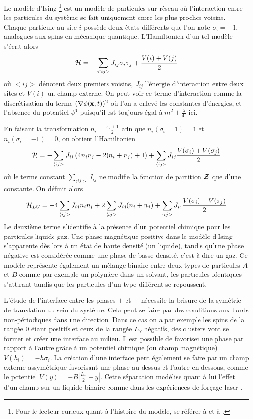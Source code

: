   	Le modèle d'Ising \footnote{Pour le lecteur curieux quant à l'histoire du modèle, se référer à \cite{niss_history_2005} et à \cite{niss_history_2009}.} est un modèle de particules sur réseau où l'interaction entre les particules du système se fait uniquement entre les plus proches voisins. Chaque particule au site $i$ possède deux états différents que l'on note $\sigma_i = \pm 1$, analogues aux spins en mécanique quantique. L'Hamiltonien d'un tel modèle s'écrit alors
\begin{equation}
	\mathcal{H} =  - \sum_{<i j >} J_{ij} \sigma_i \sigma_j + \frac{V(i)+V(j)}{2}
\end{equation}
où $< ij >$ dénotent deux premiers voisins, $J_{ij}$ l'énergie d'interaction entre deux sites et $V(i)$ un champ externe. On peut voir ce terme d'interaction comme la discrétisation du terme $(\nabla \phi({\bf x},t))^2$ où l'on a enlevé les constantes d'énergies, et l'absence du potentiel $\phi^4$ puisqu'il est toujours égal à $m^2+\frac{\lambda}{4!}$ ici. 

En faisant la transformation\cite{goldenfeld_lectures_2018} $n_i =  \frac{\sigma_i +1}{2}$ afin que $n_i(\sigma_i = 1) = 1$ et $n_i(\sigma_i = -1) = 0$, on obtient l'Hamiltonien
\begin{equation}
	\mathcal{H} =  - \sum_{\langle i j >}  J_{ij} \left( 4 n_i n_j -2 ( n_i+n_j) + 1 \right)+ \sum_{\langle i j >}  J_{ij} \frac{V(\sigma_i)+V(\sigma_j)}{2}  
\end{equation}
où le terme constant $\sum_{\langle i j >}  J_{ij}$ ne modifie la fonction de partition $\mathcal{Z}$ que d'une constante. On définit alors 
\begin{equation}
	\mathcal{H}_{LG} =  - 4 \sum_{\langle i j >}  J_{ij}  n_i n_j  + 2 \sum_{\langle i j >}  J_{ij}  (n_i+n_j) + \sum_{\langle i j >}  J_{ij} \frac{V(\sigma_i)+V(\sigma_j)}{2}  
\end{equation}
Le deuxième terme s'identifie à la présence d'un potentiel chimique pour les particules liquide-gaz. Une phase magnétique positive dans le modèle d'Ising s'apparente dès lors à un état de haute densité (un liquide), tandis qu'une phase négative est considérée comme une phase de basse densité, c'est-à-dire un gaz.
Ce modèle représente également un mélange binaire entre deux types de particules $A$ et $B$ comme par exemple un polymère dans un solvant, les particules identiques s'attirant tandis que les particules d'un type différent se repoussent. 

L'étude de l'interface entre les phases $+$ et $-$ nécessite la brisure de la symétrie de translation au sein du système. Cela peut se faire par des conditions aux bords non-périodiques dans une direction.
Dans ce cas on a par exemple les spins de la rangée $0$ étant positifs et ceux de la rangée $L_Y$ négatifs, des clusters vont se former et créer une interface au milieu. Il est possible de favoriser une phase par rapport à l'autre grâce à un potentiel chimique (ou champ magnétique) $V(h_i) = -h \sigma_i$. 
La création d'une interface peut également se faire par un champ externe assymétrique favorisant une phase au-dessus et l'autre en-dessous, comme le potentiel $V(y) = - B |\frac{L_Y}{2}-y|$. Cette séparation modélise quant à lui l'effet d'un champ  sur un liquide binaire comme dans les expériences de forçage laser \cite{girot_conical_2019}. 

